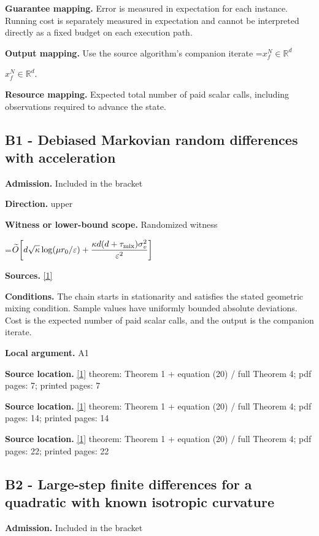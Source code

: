 \documentclass[10pt,a4paper]{article}
\newcommand{\AtlasMath}[1]{\par\begingroup\centering\setbox0=\hbox{$\displaystyle #1$}\ifdim\wd0>1.4\linewidth\typeout{ATLAS WIDE FORMULA: \the\wd0}\fi\ifdim\wd0>\linewidth\resizebox{\linewidth}{!}{\box0}\else\box0\fi\par\endgroup}
\newcommand{\AtlasInlineMath}[1]{\begingroup\setbox0=\hbox{$#1$}\ifdim\wd0>.4\linewidth\endgroup\AtlasMath{#1}\else\endgroup$#1$\fi}
\begin{document}
\textbf{Guarantee mapping.} Error is measured in expectation for each instance. Running cost is separately measured in expectation and cannot be interpreted directly as a fixed budget on each execution path.

\textbf{Output mapping.} Use the source algorithm's companion iterate \AtlasInlineMath{x_f^N\in\mathbb{R}^d}.

\textbf{Resource mapping.} Expected total number of paid scalar calls, including observations required to advance the state.

\subsection{B1 - Debiased Markovian random differences with acceleration}
\textbf{Admission.} Included in the bracket

\textbf{Direction.} upper

\textbf{Witness or lower-bound scope.} Randomized witness

\AtlasMath{\widetilde{O}\!\left[d\sqrt\kappa\log(\mu r_0/\varepsilon)+\frac{\kappa d(d+\tau_{\rm mix})\sigma_v^2}{\varepsilon^2}\right]}
\textbf{Sources.} \href{https://proceedings.mlr.press/v306/prokhorov26a.html}{[1]}

\textbf{Conditions.} The chain starts in stationarity and satisfies the stated geometric mixing condition. Sample values have uniformly bounded absolute deviations. Cost is the expected number of paid scalar calls, and the output is the companion iterate.

\textbf{Local argument.} A1

\textbf{Source location.} \href{https://proceedings.mlr.press/v306/prokhorov26a.html}{[1]} theorem: Theorem 1 + equation (20) / full Theorem 4; pdf pages: 7; printed pages: 7

\textbf{Source location.} \href{https://proceedings.mlr.press/v306/prokhorov26a.html}{[1]} theorem: Theorem 1 + equation (20) / full Theorem 4; pdf pages: 14; printed pages: 14

\textbf{Source location.} \href{https://proceedings.mlr.press/v306/prokhorov26a.html}{[1]} theorem: Theorem 1 + equation (20) / full Theorem 4; pdf pages: 22; printed pages: 22

\subsection{B2 - Large-step finite differences for a quadratic with known isotropic curvature}
\textbf{Admission.} Included in the bracket
\end{document}
